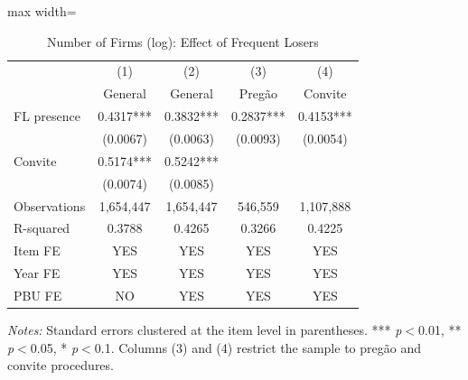 \begin{table}[htbp]
\centering
\caption{Number of Firms (log): Effect of Frequent Losers}
\label{tab:nfirms}
\begin{adjustbox}{max width=\textwidth}
\begin{threeparttable}
\small
\begin{tabular}{lcccc}
\toprule
 & (1) & (2) & (3) & (4) \\
 & General & General & Preg\~{a}o & Convite \\
\midrule
FL presence & 0.4317*** & 0.3832*** & 0.2837*** & 0.4153*** \\
 & (0.0067) & (0.0063) & (0.0093) & (0.0054) \\
Convite & 0.5174*** & 0.5242*** &  &  \\
 & (0.0074) & (0.0085) &  &  \\
\midrule
Observations & 1,654,447 & 1,654,447 & 546,559 & 1,107,888 \\
R-squared & 0.3788 & 0.4265 & 0.3266 & 0.4225 \\
Item FE & YES & YES & YES & YES \\
Year FE & YES & YES & YES & YES \\
PBU FE & NO & YES & YES & YES \\
\bottomrule
\end{tabular}
\begin{tablenotes}
\small
\item \textit{Notes:} Standard errors clustered at the item level in parentheses. *** \textit{p}$<$0.01, ** \textit{p}$<$0.05, * \textit{p}$<$0.1. Columns (3) and (4) restrict the sample to preg\~{a}o and convite procedures.
\end{tablenotes}
\end{threeparttable}
\end{adjustbox}
\end{table}
